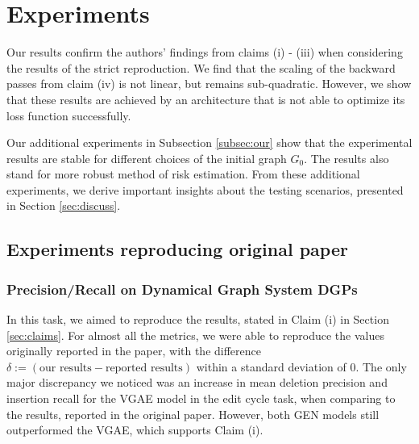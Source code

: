\section{Experiments}
\label{sec:results}
Our results confirm the authors' findings from claims (i) - (iii) when considering the results of the strict reproduction. We find that the scaling of the backward passes from claim (iv) is not linear, but remains sub-quadratic. However, we show that these results are achieved by an architecture that is not able to optimize its loss function successfully. 

Our additional experiments in Subsection \ref{subsec:our} show that the experimental results are stable for different choices of the initial graph $G_{0}$. The results also stand for more robust method of risk estimation. From these additional experiments, we derive important insights about the testing scenarios, presented in Section \ref{sec:discuss}. 




\subsection{Experiments reproducing original paper}
\label{subsec:original}

\subsubsection{Precision/Recall on Dynamical Graph System DGPs}
\label{exp:first}
In this task, we aimed to reproduce the results, stated in Claim (i) in Section \ref{sec:claims}. For almost all the metrics, we were able to reproduce the values originally reported in the paper, with the difference $\delta := (\text{our results} - \text{reported results})$ within a standard deviation of 0. The only major discrepancy we noticed was an increase in mean deletion precision and insertion recall for the VGAE model in the edit cycle task, when comparing to the results, reported in the original paper. However, both GEN models still outperformed the VGAE, which supports Claim (i).  

